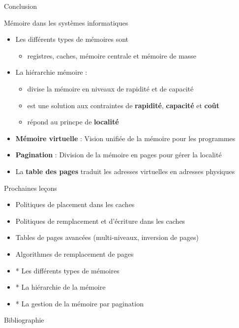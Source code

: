 \documentclass[8pt]{beamer}
\begin{document}
\begin{frame}{Conclusion}
    \begin{block}{Mémoire dans les systèmes informatiques}
        \begin{itemize}
            \item Les différents types de mémoires sont
                  \begin{itemize}
                      \item registres, caches, mémoire centrale et mémoire de
                            masse
                  \end{itemize}
            \item La hiérarchie mémoire :
                  \begin{itemize}
                      \item divise la mémoire en niveaux de rapidité et de
                            capacité
                      \item est une solution aux contraintes de
                            \textbf{rapidité},
                            \textbf{capacité} et \textbf{coût}
                      \item r\'epond au princpe de \textbf{localité}
                  \end{itemize}
            \item \textbf{Mémoire virtuelle} : Vision unifiée de la
                  mémoire pour les programmes
            \item \textbf{Pagination} : Division de la mémoire en
                  pages pour gérer la
                  localité
            \item La \textbf{table des pages} traduit les adresses
                  virtuelles en adresses physiques
        \end{itemize}
    \end{block}
    \begin{exampleblock}{Prochaines leçons}
        \begin{itemize}
            \item Politiques de placement dans les caches
            \item Politiques de remplacement et d'\'ecriture dans les caches
            \item Tables de pages avancées (multi-niveaux, inversion de pages)
            \item Algorithmes de remplacement de pages
            \item * Les différents types de mémoires
            \item * La hiérarchie de la mémoire
            \item * La gestion de la mémoire par pagination

        \end{itemize}
    \end{exampleblock}
\end{frame}


\begin{frame}{Bibliographie}
    \nocite{*}
    
\end{frame}
\addtocounter{framenumber}{-1}
\end{document}
